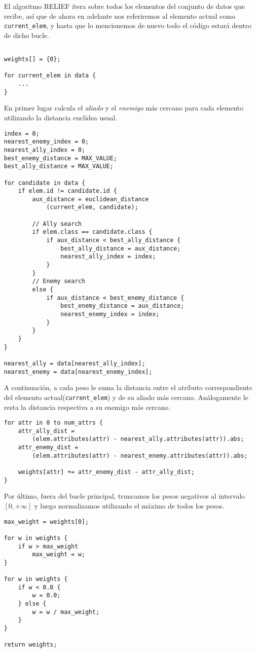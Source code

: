 \documentclass[size=a4, parskip=half, titlepage=false, toc=flat, toc=bib, 12pt]{scrartcl}
\begin{document}
El algoritmo RELIEF itera sobre todos los elementos del conjunto de datos que recibe, así que de ahora en adelante nos referiremos al elemento actual como \texttt{current\_elem}, y hasta que lo mencionemos de nuevo todo el código estará dentro de dicho bucle.
\begin{verbatim}

weights[] = {0};

for current_elem in data {
    ...
}
\end{verbatim}

En primer lugar calcula el \textit{aliado} y el \textit{enemigo} más cercano para cada elemento utilizando la distancia euclídea usual.
\begin{verbatim}
index = 0;
nearest_enemy_index = 0;
nearest_ally_index = 0;
best_enemy_distance = MAX_VALUE;
best_ally_distance = MAX_VALUE;

for candidate in data {
    if elem.id != candidate.id {
        aux_distance = euclidean_distance
            (current_elem, candidate);

        // Ally search
        if elem.class == candidate.class {
            if aux_distance < best_ally_distance {
                best_ally_distance = aux_distance;
                nearest_ally_index = index;
            }
        }
        // Enemy search
        else {
            if aux_distance < best_enemy_distance {
                best_enemy_distance = aux_distance;
                nearest_enemy_index = index;
            }
        }
    }
}

nearest_ally = data[nearest_ally_index];
nearest_enemy = data[nearest_enemy_index];
\end{verbatim}

A continuación, a cada peso le suma la distancia entre el atributo correspondiente del elemento actual(\texttt{current\_elem}) y de su aliado más cercano. Análogamente le resta la distancia respectiva a su enemigo más cercano.

\begin{verbatim}
for attr in 0 to num_attrs {
    attr_ally_dist =
        (elem.attributes(attr) - nearest_ally.attributes(attr)).abs;
    attr_enemy_dist =
        (elem.attributes(attr) - nearest_enemy.attributes(attr)).abs;

    weights[attr] += attr_enemy_dist - attr_ally_dist;
}
\end{verbatim}

Por último, fuera del bucle principal, truncamos los pesos negativos al intervalo $[0,+\infty]$ y luego normalizamos utilizando el máximo de todos los pesos.
\begin{verbatim}
max_weight = weights[0];

for w in weights {
    if w > max_weight
        max_weight = w;
}

for w in weights {
    if w < 0.0 {
        w = 0.0;
    } else {
        w = w / max_weight;
    }
}

return weights;
\end{verbatim}
\end{document}
